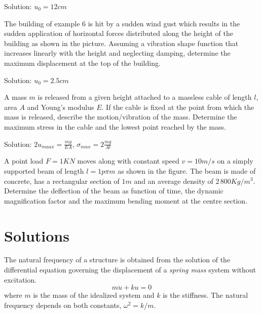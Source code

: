 \documentclass{problems}
\begin{document}
\begin{center}
\end{center}

Solution: $u_0 = 12cm$



 The building of example 6 is hit by a sudden wind gust which results in the sudden application of horizontal forces distributed along the height of the building as shown in the picture. Assuming a vibration shape function that increases linearly with the height and neglecting damping, determine the maximum displacement at the top of the building.

\begin{center}
\end{center}

Solution: $u_0 = 2.5cm$



 A mass $m$ is released from a given height attached to a massless cable of length $l$, area $A$ and Young's modulus $E$. If the cable is fixed at the point from which the mass is released, describe the motion/vibration of the mass. Determine the maximum stress in the cable and the lowest point reached by the mass.

\begin{center}
\end{center}

Solution: $2u_{maax} = \frac{mg}{EA}$, $\sigma_{max} = 2\frac{mg}{Al}$



 A point load $F=1KN$ moves along with constant speed $v=10m/s$ on a simply supported beam of length $l=1p\pi m$ as shown in the figure. The beam is made of concrete, has a rectangular section of $1m$ and an average density of $2\,800Kg/m^3$. Determine the deflection of the beam as function of time, the dynamic magnification factor and the maximum bending moment at the centre section.




\newpage
\section{Solutions}


The natural frequency of a structure is obtained from the solution of the differential equation governing the displacement of a \emph{spring mass} system without excitation.
$$
m\ddot{u}+ku=0
$$
where $m$ is the mass of the idealized system and $k$ is the stiffness. The natural frequency depends on both constants, $\omega^2 = k/m$.
\end{document}
